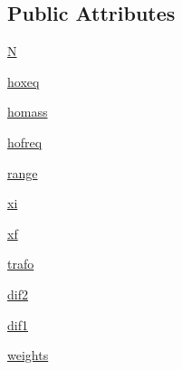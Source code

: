 \subsection*{Public Attributes}
\begin{DoxyCompactItemize}
\item 
\hyperlink{class_a_l_s_1_1dvr_1_1ho_d_v_r_a4109193ed3962578244bc06a13122e1f}{N}
\item 
\hyperlink{class_a_l_s_1_1dvr_1_1ho_d_v_r_a13ff5cc94a668d2587586e8f9fbe19a2}{hoxeq}
\item 
\hyperlink{class_a_l_s_1_1dvr_1_1ho_d_v_r_a6dadf4edce16ccb760f8c99b24c3d9ec}{homass}
\item 
\hyperlink{class_a_l_s_1_1dvr_1_1ho_d_v_r_ab35eca649a2ed2275af88ccacc2f0775}{hofreq}
\item 
\hyperlink{class_a_l_s_1_1dvr_1_1ho_d_v_r_a216429b1d7cd24e1e89148f09c695e58}{range}
\item 
\hyperlink{class_a_l_s_1_1dvr_1_1ho_d_v_r_a6fae504b43056a6b1175d53ff2fefb0a}{xi}
\item 
\hyperlink{class_a_l_s_1_1dvr_1_1ho_d_v_r_a726b39f43d5d05858ee97d6e905df1f2}{xf}
\item 
\hyperlink{class_a_l_s_1_1dvr_1_1ho_d_v_r_adc8c4e1f30cec35825b22d6086775cc0}{trafo}
\item 
\hyperlink{class_a_l_s_1_1dvr_1_1ho_d_v_r_a22af75723edc07fb3d7137ecac22a7f7}{dif2}
\item 
\hyperlink{class_a_l_s_1_1dvr_1_1ho_d_v_r_a85677f3bb6fb4dca207d86037ce423df}{dif1}
\item 
\hyperlink{class_a_l_s_1_1dvr_1_1ho_d_v_r_ad13f2aaebd427a8caa5799a9201e888c}{weights}
\end{DoxyCompactItemize}


